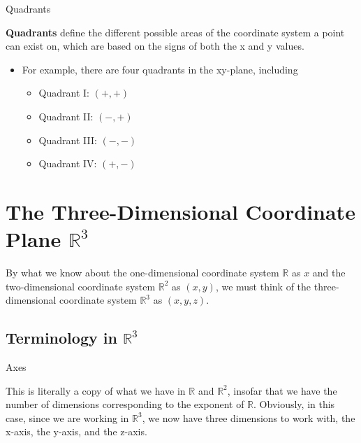 \documentclass{report}
\newcommand{\R}{\mathbb{R}}
\begin{document}
\begin{sloppypar}
\begin{definition}
  Quadrants
\end{definition}
\textbf{Quadrants} define the different
possible areas of the coordinate system a
point can exist on, which are based on
the signs of both the x and y values.
\begin{itemize}
  \item For example, there are
        four quadrants in the xy-plane, including
        \begin{itemize}
          \item Quadrant I: $ (+, +)$
          \item Quadrant II: $ (-, +)$
          \item Quadrant III: $ (-, -)$
          \item Quadrant IV: $ (+, -)$

        \end{itemize}

\end{itemize}

\section{The Three-Dimensional Coordinate
  Plane $\R^{3}$}

By what we know about the one-dimensional
coordinate system $ \R$ as $x$ and the
two-dimensional coordinate system $\R^{2}$
as $ (x, y)$, we must think of the
three-dimensional coordinate system $\R^{3}$
as $ (x, y, z)$.
\subsection{Terminology in $ \R^{3} $}

\begin{definition}
  Axes
\end{definition}

This is literally a copy of what we have
in $ \R $ and $ \R^{2} $, insofar that
we have the number of dimensions corresponding
to the exponent of $ \R $. Obviously, in
this case, since we are working in $ \R^{3} $,
we now have three dimensions to work with,
the x-axis, the y-axis, and the z-axis.


\end{sloppypar}
\end{document}
